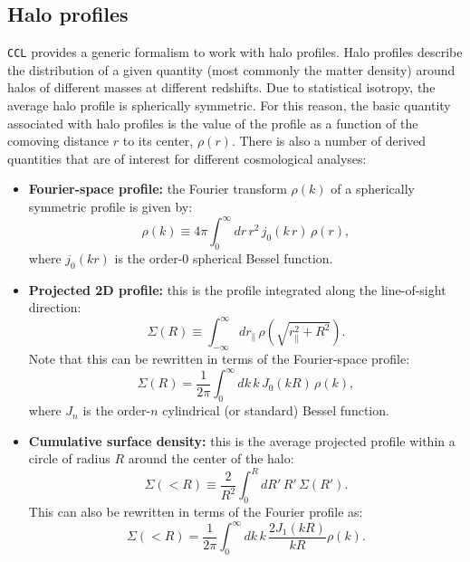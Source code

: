 \documentclass[\docopts]{\docclass}
\newcommand{\ccl}{{\tt CCL}\xspace}
\begin{document}
\subsection{Halo profiles}
\label{sec:halo_profiles}

\ccl provides a generic formalism to work with halo profiles. Halo profiles describe the distribution of a given quantity (most commonly the matter density) around halos of different masses at different redshifts. Due to statistical isotropy, the average halo profile is spherically symmetric. For this reason, the basic quantity associated with halo profiles is the value of the profile as a function of the comoving distance $r$ to its center, $\rho(r)$. There is also a number of derived quantities that are of interest for different cosmological analyses:
\begin{itemize}
 \item {\bf Fourier-space profile:} the Fourier transform $\rho(k)$ of a spherically symmetric profile is given by:
 \begin{equation}\label{eq:prof.fourier}
   \rho(k)\equiv4\pi\int_0^\infty dr\,r^2\,j_0(k\,r)\,\rho(r),
 \end{equation}
 where $j_0(kr)$ is the order-0 spherical Bessel function.
 \item {\bf Projected 2D profile:} this is the profile integrated along the line-of-sight direction:
 \begin{equation}\label{eq:prof.projected}
   \Sigma(R)\equiv\int_{-\infty}^\infty dr_\parallel\,\rho(\sqrt{r_\parallel^2+R^2}).
 \end{equation}
 Note that this can be rewritten in terms of the Fourier-space profile:
 \begin{equation}\label{eq:prof.projected.fourier}
   \Sigma(R)=\frac{1}{2\pi}\int_0^\infty dk\,k\,J_0(kR)\,\rho(k),
 \end{equation}
 where $J_n$ is the order-$n$ cylindrical (or standard) Bessel function.
 \item {\bf Cumulative surface density:} this is the average projected profile within a circle of radius $R$ around the center of the halo:
 \begin{equation}\label{eq:prof.cumul2d}
  \Sigma(<R)\equiv\frac{2}{R^2}\int_0^RdR'\,R'\,\Sigma(R').
 \end{equation}
 This can also be rewritten in terms of the Fourier profile as:
 \begin{equation}\label{eq:prof.cumul2d.fourier}
  \Sigma(<R)=\frac{1}{2\pi}\int_0^\infty dk\,k\,\frac{2J_1(kR)}{kR}\rho(k).
 \end{equation}
\end{itemize}
\end{document}
